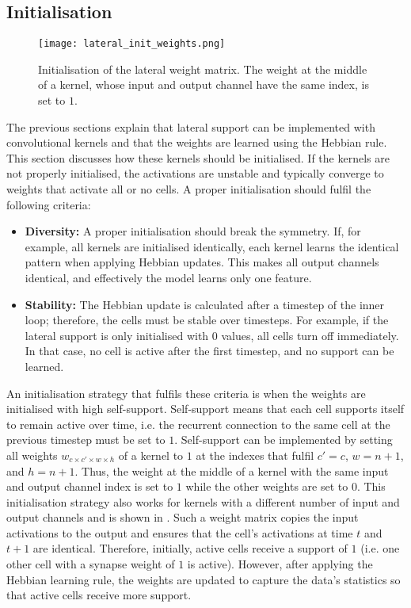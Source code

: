 \subsection{Initialisation}
\begin{figure}[h]
    \centering
    \texttt{[image: lateral\_init\_weights.png]}
    \caption[Initialisation of the lateral weight matrix]{Initialisation of the lateral weight matrix. The weight at the middle of a kernel, whose input and output channel have the same index, is set to $1$.}
\end{figure}
The previous sections explain that lateral support can be implemented with convolutional kernels and that the weights are learned using the Hebbian rule.
This section discusses how these kernels should be initialised.
If the kernels are not properly initialised, the activations are unstable and typically converge to weights that activate all or no cells.
A proper initialisation should fulfil the following criteria:

\begin{itemize}
    \item \textbf{Diversity:} A proper initialisation should break the symmetry. If, for example, all kernels are initialised identically, each kernel learns the identical pattern when applying Hebbian updates. This makes all output channels identical, and effectively the model learns only one feature.
    \item \textbf{Stability:} The Hebbian update is calculated after a timestep of the inner loop; therefore, the cells must be stable over timesteps. For example, if the lateral support is only initialised with $0$ values, all cells turn off immediately. In that case, no cell is active after the first timestep, and no support can be learned.
\end{itemize}

An initialisation strategy that fulfils these criteria is when the weights are initialised with high self-support.
Self-support means that each cell supports itself to remain active over time, i.e. the recurrent connection to the same cell at the previous timestep must be set to $1$.
Self-support can be implemented by setting all weights $w_{c \times c' \times w \times h}$ of a kernel to $1$ at the indexes that fulfil 
$c' = c$, $w = n+1$, and $h = n+1$. Thus, the weight at the middle of a kernel with the same input and output channel index is set to $1$ while the other weights are set to $0$. This initialisation strategy also works for kernels with a different number of input and output channels and is shown in .
Such a weight matrix copies the input activations to the output and ensures that the cell's activations at time $t$ and $t+1$ are identical. Therefore, initially, active cells receive a support of $1$ (i.e. one other cell with a synapse weight of $1$ is active).
However, after applying the Hebbian learning rule, the weights are updated to capture the data's statistics so that active cells receive more support.

